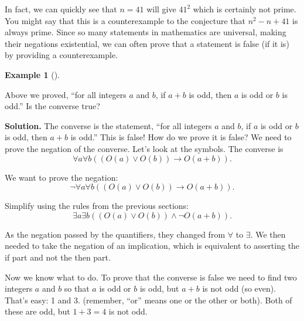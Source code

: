 \documentclass[10pt,]{book}
\theoremstyle{plain}
\theoremstyle{definition}
\newtheorem{example}[theorem]{Example}
\theoremstyle{definition}
\theoremstyle{definition}
\numberwithin{equation}{chapter}
\def\imp{\rightarrow}
\begin{document}
In fact, we can quickly see that \(n = 41\) will give \(41^2\) which is certainly not prime. You might say that this is a counterexample to the conjecture that \(n^2 - n + 41\) is always prime. Since so many statements in mathematics are universal, making their negations existential, we can often prove that a statement is false (if it is) by providing a counterexample.
%
\begin{example}[]\label{example-97}

Above we proved, ``for all integers \(a\) and \(b\), if \(a+b\) is odd, then \(a\) is odd or \(b\) is odd.'' Is the converse true?
%
\par\medskip\noindent%
\textbf{Solution.}\quad
The converse is the statement, ``for all integers \(a\) and \(b\), if \(a\) is odd or \(b\) is odd, then \(a + b\) is odd.'' This is false! How do we prove it is false? We need to prove the negation of the converse. Let's look at the symbols. The converse is
\begin{equation*}
  \forall a \forall b ((O(a) \vee O(b)) \imp O(a+b)).
\end{equation*}
%
\par

We want to prove the negation:
\begin{equation*}
  \neg \forall a \forall b ((O(a) \vee O(b)) \imp O(a+b)).
\end{equation*}
%
\par

Simplify using the rules from the previous sections:
\begin{equation*}
  \exists a \exists b ((O(a) \vee O(b)) \wedge \neg O(a+b)).
\end{equation*}
%
\par

As the negation passed by the quantifiers, they changed from \(\forall\) to \(\exists\). We then needed to take the negation of an implication, which is equivalent to asserting the if part and not the then part.
%
\par

Now we know what to do. To prove that the converse is false we need to find two integers \(a\) and \(b\) so that \(a\) is odd or \(b\) is odd, but \(a+b\) is not odd (so even). That's easy: 1 and 3. (remember, ``or'' means one or the other or both). Both of these are odd, but \(1+3 = 4\) is not odd.
%
\end{example}
\typeout{************************************************}
\typeout{************************************************}
\end{document}
